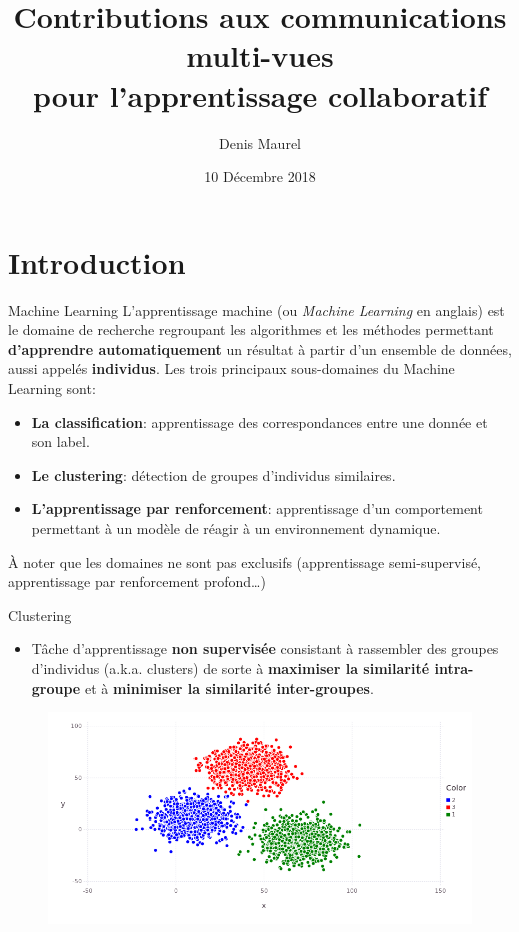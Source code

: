 \documentclass[hyperref={pdfpagelabels=false}]{beamer}
\title{Contributions aux communications multi-vues\\pour l'apprentissage collaboratif}
\date{10 Décembre 2018}
\author{Denis Maurel}
\begin{document}
    \maketitle

    \section{Introduction}
    \begin{frame}{Machine Learning}
        L'apprentissage machine (ou \textit{Machine Learning} en anglais) est le 
        domaine de recherche regroupant les algorithmes et les méthodes 
        permettant \textbf{d'apprendre automatiquement} un résultat à partir 
        d'un ensemble de données, aussi appelés \textbf{individus}.
        Les trois principaux sous-domaines du Machine Learning sont:
        \begin{itemize}
            \item<2-> {\textbf{La classification}: 
                    apprentissage des correspondances entre une donnée et son 
                label.}
            \item<3-> \textbf{Le clustering}: détection de groupes d'individus 
                similaires.
            \item<4-> {\textbf{L'apprentissage par 
                renforcement}: apprentissage d'un comportement permettant à un 
            modèle de réagir à un environnement dynamique.}
        \end{itemize}
        À noter que les domaines ne sont pas exclusifs (apprentissage 
        semi-supervisé, apprentissage par renforcement profond\ldots)
    \end{frame}

    \begin{frame}{Clustering}
        \begin{itemize}
            \item Tâche d'apprentissage \textbf{non supervisée} consistant à 
                rassembler des groupes d'individus (a.k.a. clusters) de sorte à 
                \textbf{maximiser la similarité intra-groupe} et à 
                \textbf{minimiser la similarité inter-groupes}.
        \end{itemize}

        \begin{figure}[b]
            \centering
            \includegraphics[scale=.25]{clustering}
        \end{figure}
    \end{frame}
\end{document}
